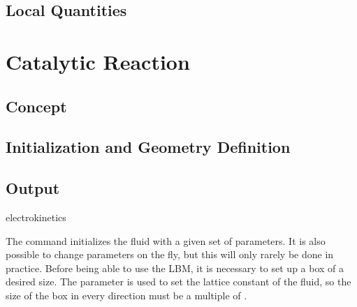 \subsection{Local Quantities}

\section{Catalytic Reaction}

\subsection{Concept}

\subsection{Initialization and Geometry Definition}

\subsection{Output}


\begin{essyntax}
  electrokinetics
  \begin{features}
  \end{features}
\end{essyntax}
The  command initializes the fluid with a given
set of parameters. It is also possible to change parameters on the
fly, but this will only rarely be done in practice. Before being able
to use the LBM, it is necessary to set up a box of a desired size. The
parameter  is used to set the lattice constant of the
fluid, so the size of the box in every direction must be a multiple of
.

